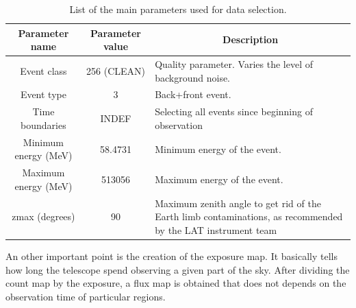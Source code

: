 \begin{table}[h]
\centering
\begin{tabular}{|c|c|p{8cm}|}
\hline
\multicolumn{1}{|c|}{\textbf{Parameter name}} & \textbf{Parameter value} & \multicolumn{1}{c|}{\textbf{Description}}                                                                   \\ \hline
Event class                         & 256 (CLEAN)              & Quality parameter. Varies the level of background noise.                                                    \\ \hline
Event type                          & 3                        & Back+front event.                                                                                           \\ \hline
Time boundaries                     & INDEF                    & Selecting all events since beginning of observation                                                         \\ \hline
Minimum energy (MeV)                & 58.4731                  & Minimum energy of the event.                                                                                \\ \hline
Maximum energy (MeV)                & 513056                   & Maximum energy of the event.                                                                                \\ \hline
zmax (degrees)                      & 90                       & Maximum zenith angle to get rid of the Earth limb contaminations, as recommended by the LAT instrument team \\ \hline
\end{tabular}
\caption{List of the main parameters used for data selection.}
\label{tab:fermi_selection_parameters}
\end{table}




An other important point is the creation of the exposure map. It basically tells how long the telescope spend observing a given part of the sky. After dividing the count map by the exposure, a flux map is obtained that does not depends on the observation time of particular regions. 

